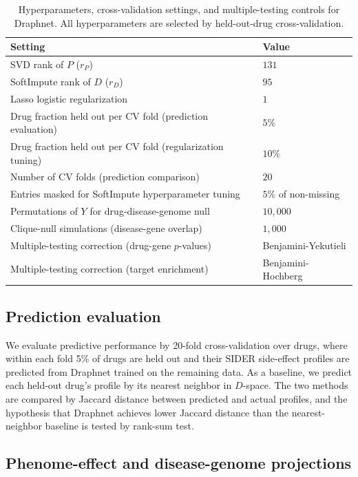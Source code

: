 \documentclass[11pt]{article}
\begin{document}
\begin{table}[htbp]
\centering
\caption{Hyperparameters, cross-validation settings, and multiple-testing
controls for Draphnet. All hyperparameters are selected by held-out-drug
cross-validation.}
\label{tab:hparams}
\begin{tabular}{ll}
\toprule
Setting & Value \\
\midrule
SVD rank of $P$ ($r_P$) & $131$ \\
SoftImpute rank of $D$ ($r_D$) & $95$ \\
Lasso logistic regularization & $1$ \\
Drug fraction held out per CV fold (prediction evaluation) & $5\%$ \\
Drug fraction held out per CV fold (regularization tuning) & $10\%$ \\
Number of CV folds (prediction comparison) & $20$ \\
Entries masked for SoftImpute hyperparameter tuning & $5\%$ of non-missing \\
Permutations of $Y$ for drug-disease-genome null & $10{,}000$ \\
Clique-null simulations (disease-gene overlap) & $1{,}000$ \\
Multiple-testing correction (drug-gene $p$-values) & Benjamini-Yekutieli \\
Multiple-testing correction (target enrichment) & Benjamini-Hochberg \\
\bottomrule
\end{tabular}
\end{table}

\subsection{Prediction evaluation}

We evaluate predictive performance by 20-fold cross-validation over
drugs, where within each fold 5\% of drugs are held out and their SIDER
side-effect profiles are predicted from Draphnet trained on the
remaining data. As a baseline, we predict each held-out drug's profile
by its nearest neighbor in $D$-space. The two methods are compared by
Jaccard distance between predicted and actual profiles, and the
hypothesis that Draphnet achieves lower Jaccard distance than the
nearest-neighbor baseline is tested by rank-sum test.

\subsection{Phenome-effect and disease-genome projections}
\end{document}
